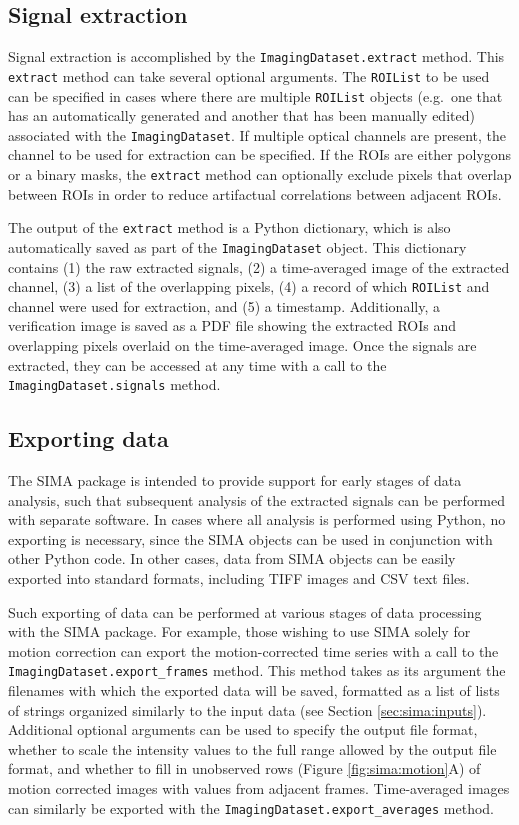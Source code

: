\subsection{Signal extraction}
Signal extraction is accomplished by the \verb|ImagingDataset.extract| method.
This \verb|extract| method can take several optional arguments.
The \verb|ROIList| to be used can be specified in cases where there are multiple
\verb|ROIList| objects (e.g.\ one that has an automatically generated and another
that has been manually edited) associated with the \verb|ImagingDataset|.
If multiple optical channels are present, the channel to be used for extraction can be
specified.
If the ROIs are either polygons or a binary masks, 
the \verb|extract| method can optionally exclude pixels that overlap between ROIs in 
order to reduce artifactual correlations between adjacent ROIs.

The output of the \verb|extract| method is a Python dictionary, which is
also automatically saved as part of the \verb|ImagingDataset| object.
This dictionary contains
(1) the raw extracted signals, 
(2) a time-averaged image of the extracted channel,
(3) a list of the overlapping pixels,
(4) a record of which \verb|ROIList| and channel were used for extraction, and
(5) a timestamp.
Additionally, a verification image is saved as a PDF file showing the extracted ROIs
and overlapping pixels overlaid on the time-averaged image.
Once the signals are extracted, they can be accessed at any time with a call to the
\verb|ImagingDataset.signals| method.

\subsection{Exporting data}
The SIMA package is intended to provide support for early stages of data analysis,
such that subsequent analysis of the extracted signals can be performed with separate software.
In cases where all analysis is performed using Python, no exporting is necessary,
since the SIMA objects can be used in conjunction with other Python code.
In other cases, data from SIMA objects can be easily exported into standard formats,
including TIFF images and CSV text files.

Such exporting of data can be performed at various stages of data processing
with the SIMA package.
For example, those wishing to use SIMA solely for motion correction can export the
motion-corrected time series with a call to the \verb|ImagingDataset.export_frames| method.
This method takes as its argument the filenames with which the exported data
will be saved,
formatted as a list of lists of strings organized similarly to the input data
(see Section \ref{sec:sima:inputs}).
Additional optional arguments can be used to specify the output file format,
whether to scale the intensity values to the full range allowed by the output file format,
and whether to fill in unobserved rows (Figure \ref{fig:sima:motion}A) of motion corrected images with values
from adjacent frames.
Time-averaged images can similarly be exported with the \verb|ImagingDataset.export_averages|
method.

